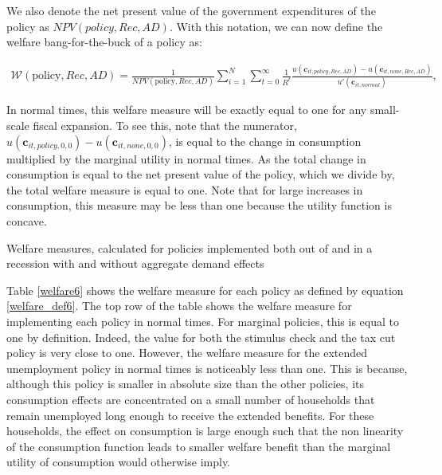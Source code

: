\documentclass[\econtexRoot/HAFiscal]{subfiles}
\begin{document}
We also denote the net present value of the government expenditures of the policy as $NPV(\textit{policy},Rec,AD)$. With this notation, we can now define the welfare bang-for-the-buck of a policy as:

\begin{align} \label{welfare_def6}
	\mathcal{W}(\text{policy},Rec,AD) =\frac{1}{NPV(\text{policy},Rec,AD)}\sum_{i=1}^{N} \sum_{t=0}^{\infty} \frac{1}{R^t} \frac{u(\mathbf{c}_{it,\textit{policy},Rec,AD}) - u(\mathbf{c}_{it,\textit{none},Rec,AD})}{ u'(\mathbf{c}_{it,\textit{normal}})} ,
\end{align}

In normal times, this welfare measure will be exactly equal to one for any small-scale fiscal expansion. To see this, note that the numerator,  $u(\mathbf{c}_{it,\textit{policy},0,0}) - u(\mathbf{c}_{it,\textit{none},0,0})$, is equal to the change in consumption multiplied by the marginal utility in normal times. As the total change in consumption is equal to the net present value of the policy, which we divide by, the total welfare measure is equal to one. Note that for large increases in consumption, this measure may be less than one because the utility function is concave.

\begin{table}[ht] 
	\center
	
	\caption{Welfare measures, calculated for policies implemented both out of and in a recession with and without aggregate demand effects}
	\notinsubfile{\label{welfare6}}
\end{table}

Table \ref{welfare6} shows the welfare measure for each policy as defined by equation \eqref{welfare_def6}. The top row of the table shows the welfare measure for implementing each policy in normal times. For marginal policies, this is equal to one by definition. Indeed, the value for both the stimulus check and the tax cut policy is very close to one. However, the welfare measure for the extended unemployment policy in normal times is noticeably less than one. This is because, although this policy is smaller in absolute size than the other policies, its consumption effects are concentrated on a small number of households that remain unemployed long enough to receive the extended benefits. For these households, the effect on consumption is large enough such that the non linearity of the consumption function leads to smaller welfare benefit than the marginal utility of consumption would otherwise imply.
\end{document}
